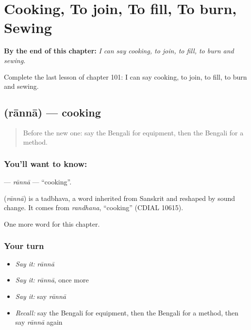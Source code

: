 
\chapter{Cooking, To join, To fill, To burn, Sewing}
\label{ch:bn-cooking-to-join-to-fill-to-burn-sewing}

\begin{chapteropening}
\textbf{By the end of this chapter:} \emph{I can say cooking, to join, to fill, to burn and sewing.}

Complete the last lesson of chapter 101: I can say cooking, to join, to fill, to burn and sewing.
\end{chapteropening}

\section[\texorpdfstring{\bn{রান্না} (rānnā)}{রান্না (rānnā)}]{ (rānnā) — cooking}

\label{lesson:BN-C101-ranna}



\begin{quote}
Before the new one: say the Bengali for equipment, then the Bengali for a method.
\end{quote}

\subsection*{You'll want to know: }
\textbf{} — \emph{rānnā} — \textquotedblleft{}cooking\textquotedblright{}.

\begin{cousinweb}
\textbf{} (\emph{rānnā}) is a tadbhava, a word inherited from Sanskrit and reshaped by sound change. It comes from \emph{randhana}, \textquotedblleft{}cooking\textquotedblright{} (CDIAL 10615).
\end{cousinweb}

\begin{grammarlens}[title={What you've built}]
One more word for this chapter.
\end{grammarlens}

\subsection*{Your turn}
\begin{itemize}
\raggedright
  \item \emph{Say it:} \emph{rānnā}
  \item \emph{Say it:} \emph{rānnā}, once more
  \item \emph{Say it:} say \emph{rānnā}
  \item \emph{Recall:} say the Bengali for equipment, then the Bengali for a method, then say \emph{rānnā} again
\end{itemize}

